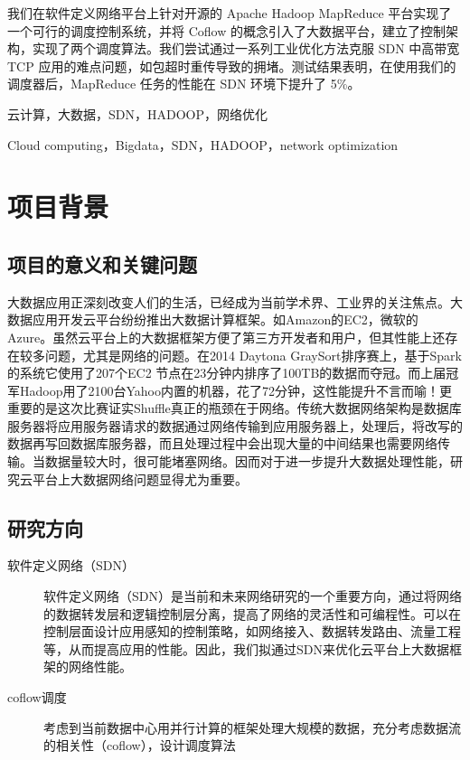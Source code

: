 \documentclass[a4paper, 11pt]{article}                                                   %
\begin{document}
\begin{CJK*}{UTF8}{song}
我们在软件定义网络平台上针对开源的 Apache Hadoop MapReduce 平台实现了一个可行的调度控制系统，并将 Coflow 的概念引入了大数据平台，建立了控制架构，实现了两个调度算法。我们尝试通过一系列工业优化方法克服 SDN 中高带宽 TCP 应用的难点问题，如包超时重传导致的拥堵。测试结果表明，在使用我们的调度器后，MapReduce 任务的性能在 SDN 环境下提升了 5\%。

{ \fontsize{10pt}{15pt}}云计算，大数据，SDN，HADOOP，网络优化
\clearpage
\begin{center}
  { \fontsize{15pt}{18pt}}
\end{center}



{ \fontsize{10pt}{15pt}}Cloud computing，Bigdata，SDN，HADOOP，network optimization
\clearpage
\tableofcontents
\section{项目背景}
\subsection{项目的意义和关键问题}
大数据应用正深刻改变人们的生活，已经成为当前学术界、工业界的关注焦点。大数据应用开发云平台纷纷推出大数据计算框架。如Amazon的EC2，微软的Azure。虽然云平台上的大数据框架方便了第三方开发者和用户，但其性能上还存在较多问题，尤其是网络的问题。在2014 Daytona GraySort排序赛上，基于Spark的系统它使用了207个EC2 节点在23分钟内排序了100TB的数据而夺冠。而上届冠军Hadoop用了2100台Yahoo内置的机器，花了72分钟，这性能提升不言而喻！更重要的是这次比赛证实Shuffle真正的瓶颈在于网络。传统大数据网络架构是数据库服务器将应用服务器请求的数据通过网络传输到应用服务器上，处理后，将改写的数据再写回数据库服务器，而且处理过程中会出现大量的中间结果也需要网络传输。当数据量较大时，很可能堵塞网络。因而对于进一步提升大数据处理性能，研究云平台上大数据网络问题显得尤为重要。\\
\subsection{研究方向}
\begin{description}
  \item[软件定义网络（SDN）] 软件定义网络（SDN）是当前和未来网络研究的一个重要方向，通过将网络的数据转发层和逻辑控制层分离，提高了网络的灵活性和可编程性。可以在控制层面设计应用感知的控制策略，如网络接入、数据转发路由、流量工程等，从而提高应用的性能。因此，我们拟通过SDN来优化云平台上大数据框架的网络性能。
  \item[coflow调度] 考虑到当前数据中心用并行计算的框架处理大规模的数据，充分考虑数据流的相关性（coflow），设计调度算法
\end{description}

\end{CJK*}
\end{document}
